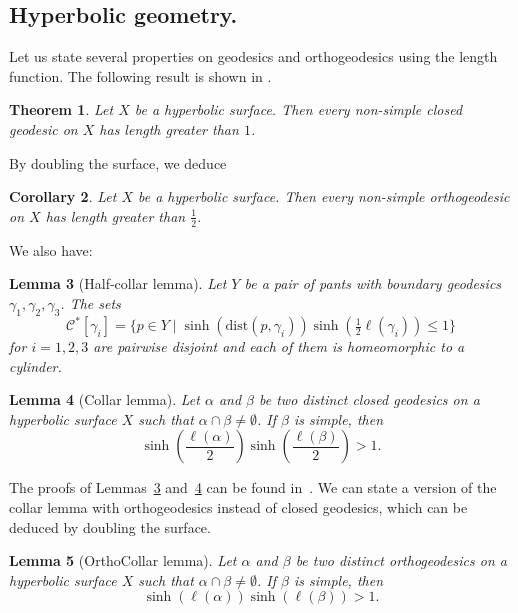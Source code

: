 \documentclass[a4paper,12pt]{article}
\newtheorem{theorem}{Theorem}[section]
\newtheorem{lemme}[theorem]{Lemma}
\newtheorem{corollaire}[theorem]{Corollary}
\theoremstyle{definition}
\theoremstyle{remark}
\begin{document}
\subsection{Hyperbolic geometry.}

Let us state several properties on geodesics and orthogeodesics using the length function. The following result is shown in \cite[Theorem~4.2.1]{buser}.

\begin{theorem}\label{thm:NonSimpleLength}
    Let $X$ be a hyperbolic surface. Then every non-simple closed geodesic on $X$ has length greater than $1$.
\end{theorem}

By doubling the surface, we deduce
\begin{corollaire}
    Let $X$ be a hyperbolic surface. Then every non-simple orthogeodesic on $X$ has length greater than $\frac{1}{2}$.
\end{corollaire}

We also have:

\begin{lemme}[Half-collar lemma]\label{lem:Half-collar}
    Let $Y$ be a pair of pants with boundary geodesics $\gamma_1, \gamma_2, \gamma_3$. The sets
    \[
        \mathcal{C}^*[\gamma_i]=\{ p \in Y \mid \sinh{(\mathrm{dist}(p,\gamma_i))}\sinh{(\tfrac{1}{2}\ell(\gamma_i))} \leqslant 1 \}
    \]
    for $i=1,2,3$ are pairwise disjoint and each of them is homeomorphic to a cylinder.
 
\end{lemme}


\begin{lemme}[Collar lemma]\label{lemme:collier}
    Let $\alpha$ and $\beta$ be two distinct closed geodesics on a hyperbolic surface $X$ such that $\alpha \cap \beta \neq \emptyset $. If $\beta$ is simple, then
    \[
        \sinh\left( \frac{\ell(\alpha)}{2} \right)\sinh\left( \frac{\ell(\beta)}{2} \right) > 1.
    \]
\end{lemme}

The proofs of Lemmas~\ref{lem:Half-collar} and~\ref{lemme:collier} can be found in~\cite{buser}. We can state a version of the collar lemma with orthogeodesics instead of closed geodesics, which can be deduced by doubling the surface.

\begin{lemme}[OrthoCollar lemma]\label{lemme:orthoCollier}
    Let $\alpha$ and $\beta$ be two distinct orthogeodesics on a hyperbolic surface $X$ such that $\alpha \cap \beta \neq \emptyset $. If $\beta$ is simple, then
    \[
        \sinh\left( \ell(\alpha) \right)\sinh\left( \ell(\beta) \right) > 1.
    \]
\end{lemme}
\end{document}
